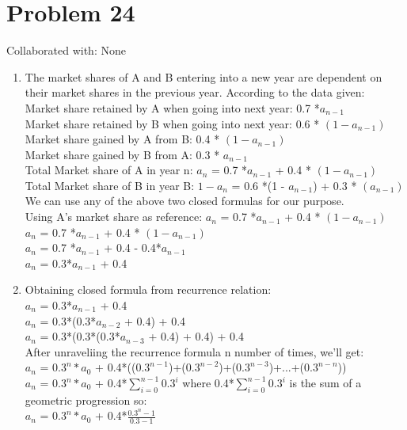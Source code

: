 \documentclass{article}
\begin{document}
\section{Problem 24}
Collaborated with: None\\
\begin{enumerate}
\item %
The market shares of A and B entering into a new year are dependent on their market shares in the previous year. According to the data given: \\
Market share retained by A when going into next year: 0.7 *$ a_{n-1}$ \\ 
Market share retained by B when going into next year:  0.6 * $(1- a_{n-1})$ \\
Market share gained by A from B:  0.4 * $(1-a_{n-1})$ \\ 
Market share gained by B from A:  0.3 * $a_{n-1}$ \\
Total Market share of A in year n: $a_{n}$ = 0.7 *$ a_{n-1}$ +  0.4 * $(1-a_{n-1})$ \\
Total Market share of B in year B: $1- a_{n}$ = 0.6 *(1 - $ a_{n-1}$) +  0.3 * $(a_{n-1})$ \\
We can use any of the above two closed formulas for our purpose. \\Using A's market share as reference: $a_{n}$ = 0.7 *$ a_{n-1}$ +  0.4 * $(1-a_{n-1})$ \\
$a_{n}$ = 0.7 *$ a_{n-1}$ +  0.4 * $(1-a_{n-1})$ \\
$a_{n}$ = 0.7 *$ a_{n-1}$ +  0.4 - 0.4*$a_{n-1}$ \\
$a_{n}$ = 0.3*$ a_{n-1}$ +  0.4  \\
\item %
Obtaining closed formula from recurrence relation: \\
$a_{n}$ = 0.3*$ a_{n-1}$ +  0.4  \\
$a_{n}$ = 0.3*(0.3*$ a_{n-2}$ + 0.4) +  0.4  \\
$a_{n}$ = 0.3*(0.3*(0.3*$ a_{n-3}$ + 0.4) + 0.4) +  0.4  \\
After unraveliing the recurrence formula n number of times, we'll get: \\
$a_{n}$ = $0.3^{n}* a_{0}$ + 0.4*(($0.3^{n-1}$)+($0.3^{n-2}$)+($0.3^{n-3}$)+...+($0.3^{n-n}$))   \\
$a_{n}$ = $0.3^{n}* a_{0}$ + 0.4*$\sum\limits_{i=0}^{n-1} 0.3^{i}$  where 0.4*$\sum\limits_{i=0}^{n-1} 0.3^{i}$ is the sum of a geometric progression so:\\
$a_{n}$ = $0.3^{n}* a_{0}$ + 0.4*$\frac{0.3^{n}-1}{0.3-1}$\\

\end{enumerate}
\end{document}
